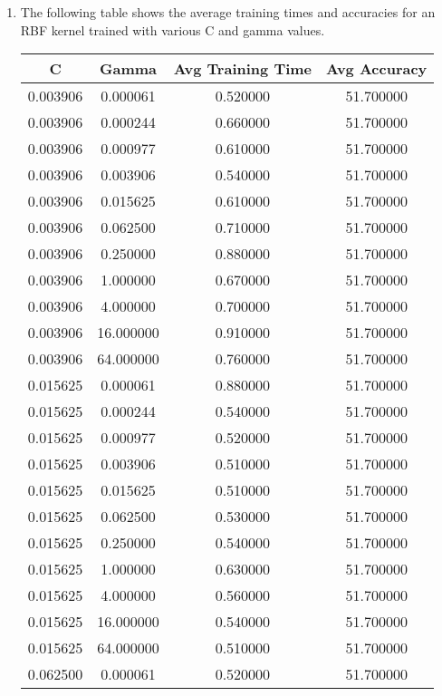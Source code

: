 \documentclass[12pt]{article}
\begin{document}
\begin{enumerate}[label=\alph*.]
	\item The following table shows the average training times and accuracies for an RBF kernel trained with various C and gamma values.
	\begin{longtable}{| c | c | c | c |} 
		\hline
	    	C & Gamma & Avg Training Time & Avg Accuracy \\
	    	\hline \hline
		0.003906 & 0.000061 & 0.520000 & 51.700000 \\
		\hline
		0.003906 & 0.000244 & 0.660000 & 51.700000 \\
		\hline
		0.003906 & 0.000977 & 0.610000 & 51.700000 \\
		\hline
		0.003906 & 0.003906 & 0.540000 & 51.700000 \\
		\hline
		0.003906 & 0.015625 & 0.610000 & 51.700000 \\
		\hline
		0.003906 & 0.062500 & 0.710000 & 51.700000 \\
		\hline
		0.003906 & 0.250000 & 0.880000 & 51.700000 \\
		\hline
		0.003906 & 1.000000 & 0.670000 & 51.700000 \\
		\hline
		0.003906 & 4.000000 & 0.700000 & 51.700000 \\
		\hline
		0.003906 & 16.000000 & 0.910000 & 51.700000 \\
		\hline
		0.003906 & 64.000000 & 0.760000 & 51.700000 \\
		\hline
		0.015625 & 0.000061 & 0.880000 & 51.700000 \\
		\hline
		0.015625 & 0.000244 & 0.540000 & 51.700000 \\
		\hline
		0.015625 & 0.000977 & 0.520000 & 51.700000 \\
		\hline
		0.015625 & 0.003906 & 0.510000 & 51.700000 \\
		\hline
		0.015625 & 0.015625 & 0.510000 & 51.700000 \\
		\hline
		0.015625 & 0.062500 & 0.530000 & 51.700000 \\
		\hline
		0.015625 & 0.250000 & 0.540000 & 51.700000 \\
		\hline
		0.015625 & 1.000000 & 0.630000 & 51.700000 \\
		\hline
		0.015625 & 4.000000 & 0.560000 & 51.700000 \\
		\hline
		0.015625 & 16.000000 & 0.540000 & 51.700000 \\
		\hline
		0.015625 & 64.000000 & 0.510000 & 51.700000 \\
		\hline
		0.062500 & 0.000061 & 0.520000 & 51.700000 \\

\end{longtable}
\end{enumerate}
\end{document}

